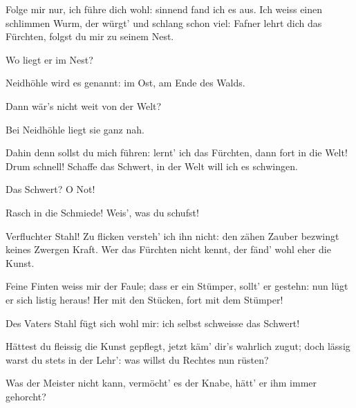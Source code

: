 \begin{drama}
\Mimespeaks

Folge mir nur,
ich führe dich wohl:
sinnend fand ich es aus.
Ich weiss einen schlimmen Wurm,
der würgt' und schlang schon viel:
Fafner lehrt dich das Fürchten,
folgst du mir zu seinem Nest.

\Siegfriedspeaks

Wo liegt er im Nest?

\Mimespeaks

Neidhöhle
wird es genannt:
im Ost, am Ende des Walds.

\Siegfriedspeaks

Dann wär's nicht weit von der Welt?

\Mimespeaks

Bei Neidhöhle liegt sie ganz nah.

\Siegfriedspeaks

Dahin denn sollst du mich führen:
lernt' ich das Fürchten,
dann fort in die Welt!
Drum schnell! Schaffe das Schwert,
in der Welt will ich es schwingen.

\Mimespeaks

Das Schwert? O Not!

\Siegfriedspeaks

Rasch in die Schmiede!
Weis', was du schufst!

\Mimespeaks

Verfluchter Stahl!
Zu flicken versteh' ich ihn nicht:
den zähen Zauber
bezwingt keines Zwergen Kraft.
Wer das Fürchten nicht kennt,
der fänd' wohl eher die Kunst.

\Siegfriedspeaks

Feine Finten
weiss mir der Faule;
dass er ein Stümper,
sollt' er gestehn:
nun lügt er sich listig heraus!
Her mit den Stücken,
fort mit dem Stümper!


Des Vaters Stahl
fügt sich wohl mir:
ich selbst schweisse das Schwert!


\Mimespeaks

Hättest du fleissig
die Kunst gepflegt,
jetzt käm' dir's wahrlich zugut;
doch lässig warst du
stets in der Lehr':
was willst du Rechtes nun rüsten?

\Siegfriedspeaks

Was der Meister nicht kann,
vermöcht' es der Knabe,
hätt' er ihm immer gehorcht?



\end{drama}
